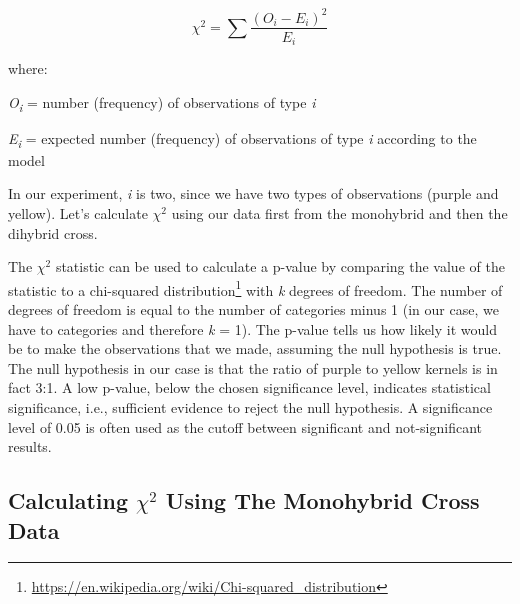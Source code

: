 \documentclass[]{book}
\let\rmarkdownfootnote\footnote%
\def\footnote{\protect\rmarkdownfootnote}
\renewcommand{\href}[2]{#2\footnote{\url{#1}}}
\begin{document}
\[ \chi^2=\sum\frac{(O_{i}-E_{i})^{2}}{E_{i}} \]

where:

\emph{O\textsubscript{i}} = number (frequency) of observations of type
\emph{i}

\emph{E\textsubscript{i}} = expected number (frequency) of observations
of type \emph{i} according to the model

In our experiment, \emph{i} is two, since we have two types of
observations (purple and yellow). Let's calculate \(\chi^2\) using our
data first from the monohybrid and then the dihybrid cross.

The \(\chi^2\) statistic can be used to calculate a p-value by comparing
the value of the statistic to a
\href{https://en.wikipedia.org/wiki/Chi-squared_distribution}{chi-squared
distribution} with \emph{k} degrees of freedom. The number of degrees of
freedom is equal to the number of categories minus 1 (in our case, we
have to categories and therefore \emph{k} = 1). The p-value tells us how
likely it would be to make the observations that we made, assuming the
null hypothesis is true. The null hypothesis in our case is that the
ratio of purple to yellow kernels is in fact 3:1. A low p-value, below
the chosen significance level, indicates statistical significance, i.e.,
sufficient evidence to reject the null hypothesis. A significance level
of 0.05 is often used as the cutoff between significant and
not-significant results.

\subsection{\texorpdfstring{Calculating \(\chi^2\) Using The Monohybrid
Cross
Data}{Calculating \textbackslash{}chi\^{}2 Using The Monohybrid Cross Data}}\label{calculating-chi2-using-the-monohybrid-cross-data}
\end{document}

